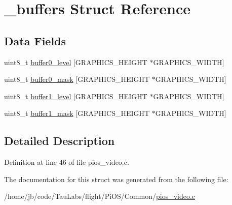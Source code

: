 \hypertarget{struct__buffers}{\section{\-\_\-buffers \-Struct \-Reference}
\label{struct__buffers}
}
\subsection*{\-Data \-Fields}
\begin{DoxyCompactItemize}
\item 
uint8\-\_\-t \hyperlink{group___p_i_o_s___v_i_d_e_o_ga3b52f2bd3c15f12d7a7257c5d8ff2627}{buffer0\-\_\-level} \mbox{[}\-G\-R\-A\-P\-H\-I\-C\-S\-\_\-\-H\-E\-I\-G\-H\-T $\ast$\-G\-R\-A\-P\-H\-I\-C\-S\-\_\-\-W\-I\-D\-T\-H\mbox{]}
\item 
uint8\-\_\-t \hyperlink{group___p_i_o_s___v_i_d_e_o_ga9620d63e32309e41277c6dd2dc8ee2ae}{buffer0\-\_\-mask} \mbox{[}\-G\-R\-A\-P\-H\-I\-C\-S\-\_\-\-H\-E\-I\-G\-H\-T $\ast$\-G\-R\-A\-P\-H\-I\-C\-S\-\_\-\-W\-I\-D\-T\-H\mbox{]}
\item 
uint8\-\_\-t \hyperlink{group___p_i_o_s___v_i_d_e_o_ga63add1136b802684b982c920c01ae697}{buffer1\-\_\-level} \mbox{[}\-G\-R\-A\-P\-H\-I\-C\-S\-\_\-\-H\-E\-I\-G\-H\-T $\ast$\-G\-R\-A\-P\-H\-I\-C\-S\-\_\-\-W\-I\-D\-T\-H\mbox{]}
\item 
uint8\-\_\-t \hyperlink{group___p_i_o_s___v_i_d_e_o_gad0338825ac9f4f66d1f1cc5147b69aa7}{buffer1\-\_\-mask} \mbox{[}\-G\-R\-A\-P\-H\-I\-C\-S\-\_\-\-H\-E\-I\-G\-H\-T $\ast$\-G\-R\-A\-P\-H\-I\-C\-S\-\_\-\-W\-I\-D\-T\-H\mbox{]}
\end{DoxyCompactItemize}


\subsection{\-Detailed \-Description}


\-Definition at line 46 of file pios\-\_\-video.\-c.



\-The documentation for this struct was generated from the following file\-:\begin{DoxyCompactItemize}
\item 
/home/jb/code/\-Tau\-Labs/flight/\-Pi\-O\-S/\-Common/\hyperlink{pios__video_8c}{pios\-\_\-video.\-c}\end{DoxyCompactItemize}
